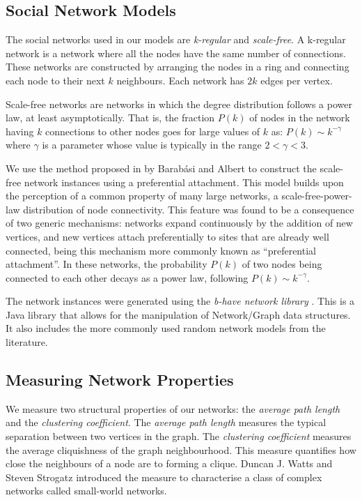 \documentclass[preprint,number]{elsarticle}
\begin{document}
\subsection{Social Network Models}
\label{sec:exp-setup_network_models}
\noindent The social networks used in our models are \textit{k-regular} and \textit{scale-free}. A k-regular network is a network where all the nodes have the same number of connections. These networks are constructed by arranging the nodes in a ring and connecting each node to their next $k$ neighbours. Each network has $2k$ edges per vertex. 

Scale-free networks are networks in which the degree distribution follows a power law, at least asymptotically. That is, the fraction $P(k)$ of nodes in the network having $k$ connections to other nodes goes for large values of $k$ as: $ P(k)  \sim  k^{-\gamma}$ where $\gamma$ is a parameter whose value is typically in the range $2 < \gamma < 3$.

We use the method proposed in \cite{Barabasi1999} by Barab\'{a}si and Albert to construct the scale-free network instances using a preferential attachment. This model builds upon the perception of a common property of many large networks, a scale-free-power-law distribution of node connectivity. This feature was found to be a consequence of two generic mechanisms: networks expand continuously by the addition of new vertices, and new vertices attach preferentially to sites that are already well connected, being this mechanism more commonly known as ``preferential attachment''. In these networks, the probability $P(k)$ of two nodes being connected to each other decays as a power law, following $P(k) \sim k^{- \gamma}$.

The network instances were generated using the \textit{b-have network library} \cite{Nunes:Software:11069}. This is a Java library that allows for the manipulation of Network/Graph data structures. It also includes the more commonly used random network models from the literature. 

\subsection{Measuring Network Properties}
\noindent We measure two structural properties of our networks: the \textit{average path length} and the \textit{clustering coefficient}. The \textit{average path length} measures the typical separation between two vertices in the graph. The \textit{clustering coefficient} measures the average cliquishness of the graph neighbourhood. This measure quantifies how close the neighbours of a node are to forming a clique. Duncan J. Watts and Steven Strogatz \cite{Watts1998} introduced the measure to characterise a class of complex networks called small-world networks. 
\end{document}

